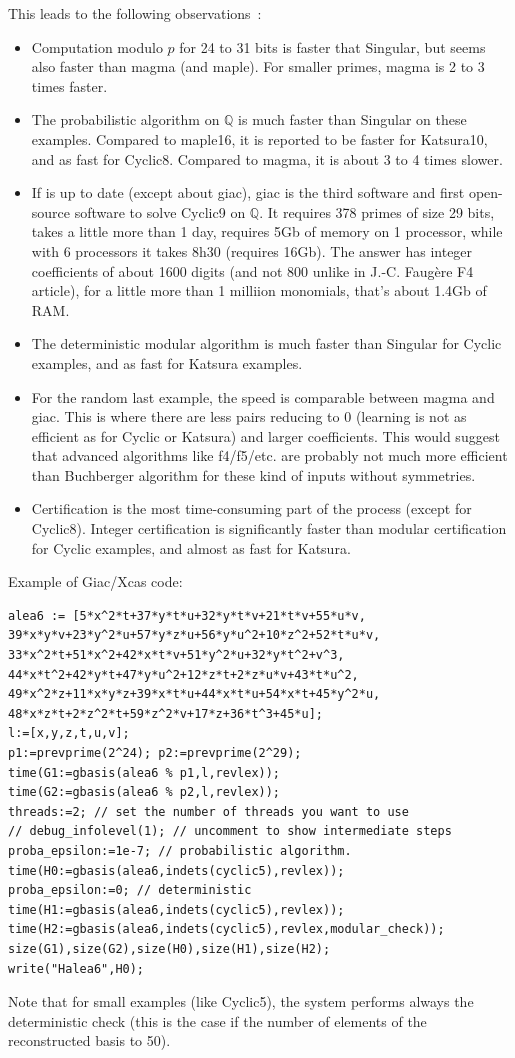 \documentclass[a4paper,11pt]{article}
\newcommand{\Q}{{\mathbb{Q}}}
\begin{document}
\begin{giacjshere}
This leads to the following observations~:
\begin{itemize}
\item Computation modulo $p$ for 24 to 31 bits is faster that Singular, but seems also
  faster than magma (and maple). For smaller primes, magma is 2 to 3
  times faster.
\item The probabilistic algorithm on $\Q$ is much faster than Singular on these examples.
Compared to maple16, it is reported to be faster for Katsura10, 
and as fast for Cyclic8. Compared to magma, it is about 3 to 4
times slower. 
\item If \cite{magma} is up to date (except about giac), giac is the third software and first
  open-source software to solve Cyclic9 on $\Q$. It requires 378
  primes of size 29 bits, takes a little more than 1 day, requires 5Gb
  of memory on 1 processor, while with 6 processors it takes
8h30 (requires 16Gb). The answer has integer coefficients of about 1600 digits
(and not 800 unlike in J.-C. Faug\`ere F4 article), for a little
more than 1 milliion monomials, that's about 1.4Gb of RAM.
\item The deterministic modular algorithm is much faster than Singular for Cyclic examples,
and as fast for Katsura examples. 
\item For the random last example, the speed is comparable between
  magma and giac. This is where there are less pairs reducing to
  0 (learning is not as efficient as for Cyclic or Katsura) and larger
  coefficients. This would suggest that advanced algorithms 
like f4/f5/etc. are probably
not much more efficient than Buchberger algorithm for these kind
of inputs without symmetries.
\item Certification is the most time-consuming part of the process (except
for Cyclic8). Integer certification is significantly faster than modular certification
for Cyclic examples, and almost as fast for Katsura.
\end{itemize}

Example of Giac/Xcas code:
\begin{verbatim}
alea6 := [5*x^2*t+37*y*t*u+32*y*t*v+21*t*v+55*u*v,
39*x*y*v+23*y^2*u+57*y*z*u+56*y*u^2+10*z^2+52*t*u*v,
33*x^2*t+51*x^2+42*x*t*v+51*y^2*u+32*y*t^2+v^3,
44*x*t^2+42*y*t+47*y*u^2+12*z*t+2*z*u*v+43*t*u^2,
49*x^2*z+11*x*y*z+39*x*t*u+44*x*t*u+54*x*t+45*y^2*u,
48*x*z*t+2*z^2*t+59*z^2*v+17*z+36*t^3+45*u];
l:=[x,y,z,t,u,v];
p1:=prevprime(2^24); p2:=prevprime(2^29);
time(G1:=gbasis(alea6 % p1,l,revlex));
time(G2:=gbasis(alea6 % p2,l,revlex));
threads:=2; // set the number of threads you want to use
// debug_infolevel(1); // uncomment to show intermediate steps
proba_epsilon:=1e-7; // probabilistic algorithm.
time(H0:=gbasis(alea6,indets(cyclic5),revlex));
proba_epsilon:=0; // deterministic
time(H1:=gbasis(alea6,indets(cyclic5),revlex));
time(H2:=gbasis(alea6,indets(cyclic5),revlex,modular_check));
size(G1),size(G2),size(H0),size(H1),size(H2);
write("Halea6",H0);
\end{verbatim}
Note that for small examples (like Cyclic5), the system performs always the deterministic
check (this is the case if the number of elements of the reconstructed basis
to 50).


\end{giacjshere}
\end{document}
